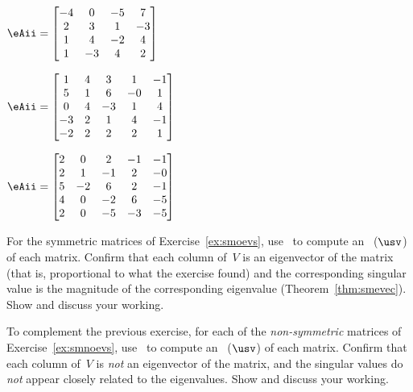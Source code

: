 \begin{exercise}
\begin{parts}
\item \(\eAii=\begin{bmatrix} -4&0&-5&7
\\2&3&1&-3
\\1&4&-2&4
\\1&-3&4&2 \end{bmatrix}\)

\item \(\eAii=\begin{bmatrix} 1&4&3&1&-1
\\5&1&6&-0&1
\\0&4&-3&1&4
\\-3&2&1&4&-1
\\-2&2&2&2&1 \end{bmatrix}\)

\item \(\eAii=\begin{bmatrix} 2&0&2&-1&-1
\\2&1&-1&2&-0
\\5&-2&6&2&-1
\\4&0&-2&6&-5
\\2&0&-5&-3&-5 \end{bmatrix}\)

\end{parts}
\end{exercise}




\begin{exercise} \label{ex:} 
For the symmetric matrices of Exercise~\ref{ex:smoevs}, use \script\ to compute an \svd\ (\(\usv\)) of each matrix.
Confirm that each column of~\(V\) is an eigenvector of the matrix (that is, proportional to what the exercise found) and the corresponding singular value is the magnitude of the corresponding eigenvalue (Theorem~\ref{thm:smevec}).
Show and discuss your working.
\end{exercise}




\begin{exercise} \label{ex:} 
To complement the previous exercise, for each of the \emph{non-symmetric} matrices of Exercise~\ref{ex:smnoevs}, use \script\ to compute an \svd\ (\(\usv\)) of each matrix.
Confirm that each column of~\(V\) is \emph{not} an eigenvector of the matrix, and the singular values do \emph{not} appear closely related to the eigenvalues.
Show and discuss your working.
\end{exercise}












